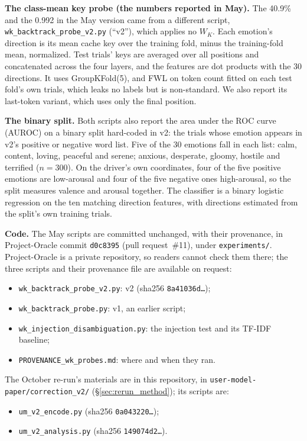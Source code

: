 \documentclass[11pt,a4paper]{article}
\begin{document}
\textbf{The class-mean key probe (the numbers reported in May).} The 40.9\% and the 0.992 in the May version came from a different script, \texttt{wk\_backtrack\_probe\_v2.py} (``v2''), which applies no $W_K$. Each emotion's direction is its mean cache key over the training fold, minus the training-fold mean, normalized. Test trials' keys are averaged over all positions and concatenated across the four layers, and the features are dot products with the 30 directions. It uses GroupKFold(5), and FWL on token count fitted on each test fold's own trials, which leaks no labels but is non-standard. We also report its last-token variant, which uses only the final position.

\textbf{The binary split.} Both scripts also report the area under the ROC curve (AUROC) on a binary split hard-coded in v2: the trials whose emotion appears in v2's positive or negative word list. Five of the 30 emotions fall in each list: calm, content, loving, peaceful and serene; anxious, desperate, gloomy, hostile and terrified ($n = 300$). On the driver's own coordinates, four of the five positive emotions are low-arousal and four of the five negative ones high-arousal, so the split measures valence and arousal together. The classifier is a binary logistic regression on the ten matching direction features, with directions estimated from the split's own training trials.

\textbf{Code.} The May scripts are committed unchanged, with their provenance, in Project-Oracle commit \texttt{d0c8395} (pull request~\#11), under \texttt{experiments/}. Project-Oracle is a private repository, so readers cannot check them there; the three scripts and their provenance file are available on request:
\begin{itemize}[nosep]
    \item \texttt{wk\_backtrack\_probe\_v2.py}: v2 (sha256 \texttt{8a41036d\ldots});
    \item \texttt{wk\_backtrack\_probe.py}: v1, an earlier script;
    \item \texttt{wk\_injection\_disambiguation.py}: the injection test and its TF-IDF baseline;
    \item \texttt{PROVENANCE\_wk\_probes.md}: where and when they ran.
\end{itemize}
The October re-run's materials are in this repository, in \texttt{user-model-paper/correction\_v2/} (\S\ref{sec:rerun_method}); its scripts are:
\begin{itemize}[nosep]
    \item \texttt{um\_v2\_encode.py} (sha256 \texttt{0a043220\ldots});
    \item \texttt{um\_v2\_analysis.py} (sha256 \texttt{149074d2\ldots}).
\end{itemize}
\end{document}
